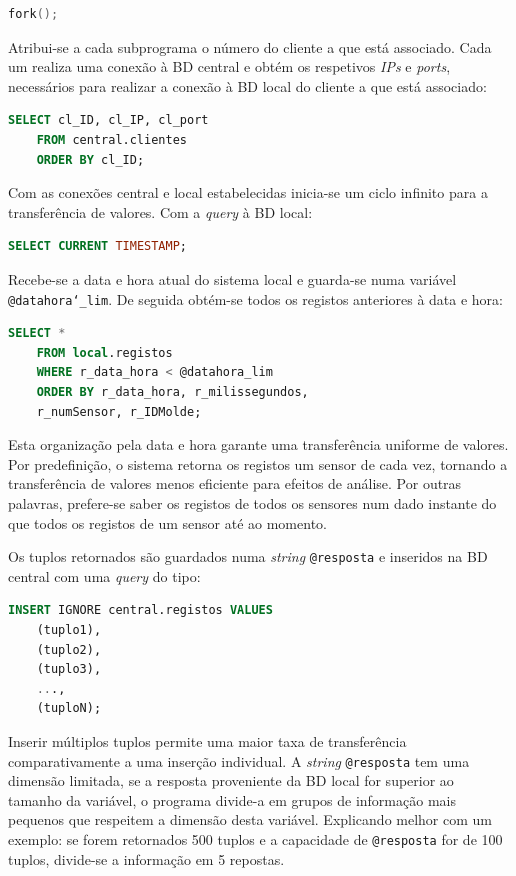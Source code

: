 \documentclass[11pt,twoside,a4paper]{report}
\begin{document}
\begin{lstlisting}[language = C]
	fork();
\end{lstlisting}
Atribui-se a cada subprograma o número do cliente a que está associado. Cada um realiza uma conexão à BD central e obtém os respetivos \textit{IPs} e \textit{ports}, necessários para realizar a conexão à BD local do cliente a que está associado:
\begin{lstlisting}[language = SQL]
	SELECT cl_ID, cl_IP, cl_port
	FROM central.clientes
	ORDER BY cl_ID;
\end{lstlisting}
Com as conexões central e local estabelecidas inicia-se um ciclo infinito para a transferência de valores. Com a \textit{query} à BD local:
\begin{lstlisting}[language = SQL]
	SELECT CURRENT TIMESTAMP;
\end{lstlisting}
Recebe-se a data e hora atual do sistema local e guarda-se numa variável \texttt{@datahora\char`_lim}. De seguida obtém-se todos os registos anteriores à data e hora:
\begin{lstlisting}[language = SQL]
	SELECT *
	FROM local.registos
	WHERE r_data_hora < @datahora_lim
	ORDER BY r_data_hora, r_milissegundos,
	r_numSensor, r_IDMolde;
\end{lstlisting}
Esta organização pela data e hora garante uma transferência uniforme de valores. Por predefinição, o sistema retorna os registos um sensor de cada vez, tornando a transferência de valores menos eficiente para efeitos de análise. Por outras palavras, prefere-se saber os registos de todos os sensores num dado instante do que todos os registos de um sensor até ao momento.\par 
Os tuplos retornados são guardados numa \textit{string} \texttt{@resposta} e inseridos na BD central com uma \textit{query} do tipo:
\begin{lstlisting}[language = SQL]
	INSERT IGNORE central.registos VALUES
	(tuplo1),
	(tuplo2),
	(tuplo3),
	...,
	(tuploN);
\end{lstlisting}
Inserir múltiplos tuplos permite uma maior taxa de transferência comparativamente a uma inserção individual. A \textit{string} \texttt{@resposta} tem uma dimensão limitada, se a resposta proveniente da BD local for superior ao tamanho da variável, o programa divide-a em grupos de informação mais pequenos que respeitem a dimensão desta variável. Explicando melhor com um exemplo: se forem retornados 500 tuplos e a capacidade de \texttt{@resposta} for de 100 tuplos, divide-se a informação em 5 repostas.\par 
\end{document}
